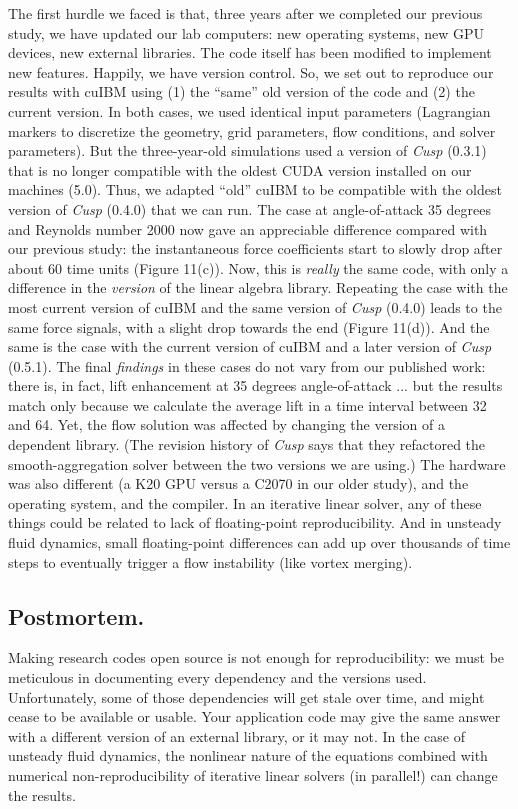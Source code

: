 \documentclass[9pt,twocolumn,twoside]{article}
\newlength{\up}
\begin{document}
The first hurdle we faced is that, three years after we completed our previous study, we have updated our lab computers: 
new operating systems, new GPU devices, new external libraries. 
The code itself has been modified to implement new features. 
Happily, we have version control.
So, we set out to reproduce our results with cuIBM using (1) the ``same''  old version of the code and (2) the current version. 
In both cases, we used identical input parameters (Lagrangian markers to discretize the geometry, grid parameters, flow conditions, and solver parameters). 
But the three-year-old simulations used a version of \textsl{Cusp} (0.3.1) that is no longer compatible with the oldest CUDA version installed on our machines (5.0). 
Thus, we adapted ``old'' cuIBM to be compatible with the oldest version of \textsl{Cusp} (0.4.0) that we can run. 
The case at angle-of-attack 35 degrees and Reynolds number 2000 now gave an appreciable difference compared with our previous study: 
the instantaneous force coefficients start to slowly drop after about 60 time units (Figure 11(c)). 
Now, this is \textit{really} the same code, with only a difference in the \textit{version} of the linear algebra library. 
Repeating the case with the most current version of cuIBM and the same version of \textsl{Cusp} (0.4.0) leads to the same force signals, with a slight drop towards the end (Figure 11(d)). 
And the same is the case with the current version of cuIBM and a later version of \textsl{Cusp} (0.5.1). 
The final \textit{findings} in these cases do not vary from our published work: there is, in fact, lift enhancement at 35 degrees angle-of-attack ... but the results match only because we calculate the average lift in a time interval between 32 and 64. 
Yet, the flow solution was affected by changing the version of a dependent library. 
(The revision history of \textsl{Cusp} says that they refactored the smooth-aggregation solver between the two versions we are using.) 
The hardware was also different (a K20 GPU versus a C2070 in our older study), and the operating system, and the compiler. 
In an iterative linear solver, any of these things could be related to lack of floating-point reproducibility. 
And in unsteady fluid dynamics, small floating-point differences can add up over thousands of time steps to eventually trigger a flow instability (like vortex merging).

\subsection*{Postmortem.} 
Making research codes open source is not enough for reproducibility: we must be meticulous in documenting every dependency and the versions used. 
Unfortunately, some of those dependencies will get stale over time, and might cease to be available or usable. 
Your application code may give the same answer with a different version of an external library, or it may not. 
In the case of unsteady fluid dynamics, the nonlinear nature of the equations combined with numerical non-reproducibility of iterative linear solvers (in parallel!) can change the results. 
\end{document}
